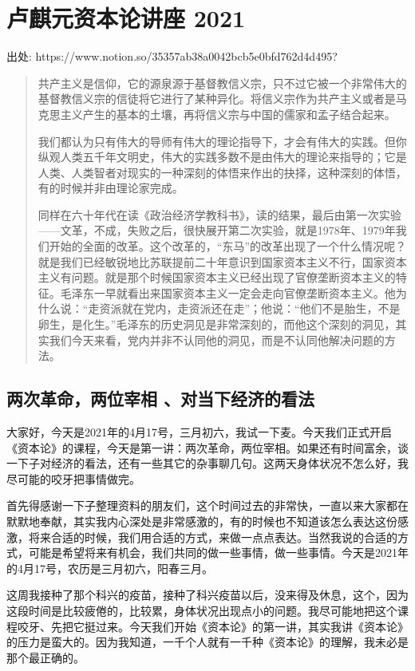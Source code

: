 \documentclass[UTF8, 12pt, a4paper]{ctexrep}
\begin{document}
\newpage

\chapter{卢麒元资本论讲座 2021}

出处: https://www.notion.so/35357ab38a0042bcb5e0bfd762d4d495?

\begin{quotation}
    共产主义是信仰，它的源泉源于基督教信义宗，只不过它被一个非常伟大的基督教信义宗的信徒将它进行了某种异化。将信义宗作为共产主义或者是马克思主义产生的基本的土壤，再将信义宗与中国的儒家和孟子结合起来。

    我们都认为只有伟大的导师有伟大的理论指导下，才会有伟大的实践。但你纵观人类五千年文明史，伟大的实践多数不是由伟大的理论来指导的；它是人类、人类智者对现实的一种深刻的体悟来作出的抉择，这种深刻的体悟，有的时候并非由理论家完成。

    同样在六十年代在读《政治经济学教科书》，读的结果，最后由第一次实验——文革，不成，失败之后，很快展开第二次实验，就是1978年、1979年我们开始的全面的改革。这个改革的，“东马”的改革出现了一个什么情况呢？就是我们已经敏锐地比苏联提前二十年意识到国家资本主义不行，国家资本主义有问题。就是那个时候国家资本主义已经出现了官僚垄断资本主义的特征。毛泽东一早就看出来国家资本主义一定会走向官僚垄断资本主义。他为什么说：“走资派就在党内，走资派还在走”；他说：“他们不是胎生，不是卵生，是化生。”毛泽东的历史洞见是非常深刻的，而他这个深刻的洞见，其实我们今天来看，党内并非不认同他的洞见，而是不认同他解决问题的方法。
\end{quotation}

\newpage

\section{两次革命，两位宰相 、对当下经济的看法}

大家好，今天是2021年的4月17号，三月初六，我试一下麦。今天我们正式开启《资本论》的课程，今天是第一讲：两次革命，两位宰相。如果还有时间富余，谈一下子对经济的看法，还有一些其它的杂事聊几句。这两天身体状况不怎么好，我尽可能的咬牙把事情做完。

首先得感谢一下子整理资料的朋友们，这个时间过去的非常快，一直以来大家都在默默地奉献，其实我内心深处是非常感激的，有的时候也不知道该怎么表达这份感激，将来合适的时候，我们用合适的方式，来做一点点表达。当然我说的合适的方式，可能是希望将来有机会，我们共同的做一些事情，做一些事情。今天是2021年的4月17号，农历是三月初六，阳春三月。

这周我接种了那个科兴的疫苗，接种了科兴疫苗以后，没来得及休息，这个，因为这段时间是比较疲倦的，比较累，身体状况出现点小的问题。我尽可能地把这个课程咬牙、先把它挺过来。今天我们开始《资本论》的第一讲，其实我讲《资本论》的压力是蛮大的。因为我知道，一千个人就有一千种《资本论》的理解，我未必是那个最正确的。
\end{document}
